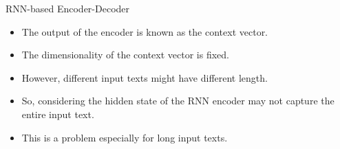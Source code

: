     
            
            

            



\begin{frame}{RNN-based Encoder-Decoder}
\begin{itemize}
    \item The output of the encoder is known as the context vector.
    \item The dimensionality of the context vector is fixed. 
    \item However, different input texts might have different length. 
    \item So, considering the hidden state of the RNN encoder may not capture the entire input text.
    \item This is a problem  especially for long input texts. 
\end{itemize}
\end{frame}

